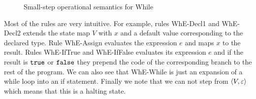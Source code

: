 \begin{figure}[h]
  \centering
  
  \RuleSpace

  
  \RuleSpace


  \RuleSpace


  \RuleSpace

  { \: \rightarrow \: }

  \RuleSpace 

  { \: \rightarrow \: }
  
  \RuleSpace


  \caption{Small-step operational semantics for While}
  \label{fig:while_sos}
\end{figure}

Most of the rules are very intuitive. For example, rules {\sc WhE-Decl1} and {\sc
WhE-Decl2} extends the state map $V$ with $x$ and a default value corresponding
to the declared type. Rule {\sc WhE-Assign} evaluates the expression $e$ and
maps $x$ to the result. Rules {\sc WhE-IfTrue} and {\sc WhE-IfFalse} evaluates
its expression $e$ and if the result is $\mbox{\texttt{true}}$ or $\mbox{\texttt{false}}$ they prepend the
code of the corresponding branch to the rest of the program. We can also see
that {\sc WhE-While} is just an expansion of a while loop into an if statement.
Finally we note that we can not step from $\langle V, \varepsilon \rangle$ which means
that this is a halting state.

